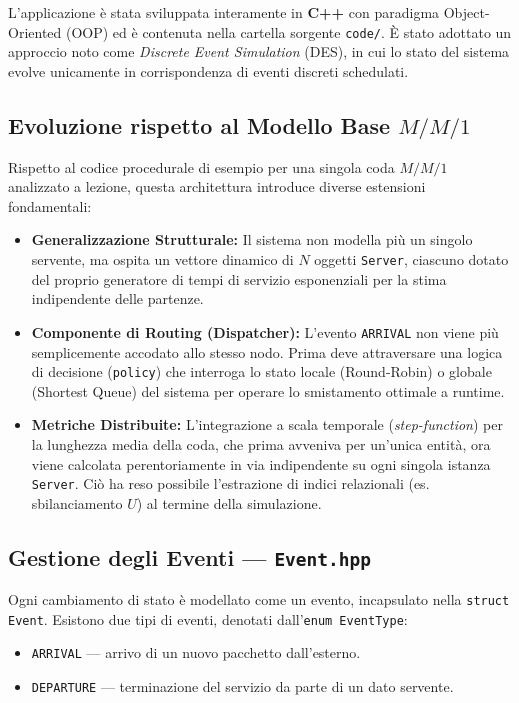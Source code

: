 \documentclass[12pt,a4paper]{article}
\begin{document}
L'applicazione è stata sviluppata interamente in \textbf{C++} con paradigma Object-Oriented (OOP) ed è contenuta nella cartella sorgente \texttt{code/}. È stato adottato un approccio noto come \textit{Discrete Event Simulation} (DES), in cui lo stato del sistema evolve unicamente in corrispondenza di eventi discreti schedulati.

\subsection{Evoluzione rispetto al Modello Base \texorpdfstring{$M/M/1$}{M/M/1}}

Rispetto al codice procedurale di esempio per una singola coda $M/M/1$ analizzato a lezione, questa architettura introduce diverse estensioni fondamentali:
\begin{itemize}
  \item \textbf{Generalizzazione Strutturale:} Il sistema non modella più un singolo servente, ma ospita un vettore dinamico di $N$ oggetti \texttt{Server}, ciascuno dotato del proprio generatore di tempi di servizio esponenziali per la stima indipendente delle partenze.
  \item \textbf{Componente di Routing (Dispatcher):} L'evento \texttt{ARRIVAL} non viene più semplicemente accodato allo stesso nodo. Prima deve attraversare una logica di decisione (\texttt{policy}) che interroga lo stato locale (Round-Robin) o globale (Shortest Queue) del sistema per operare lo smistamento ottimale a runtime.
  \item \textbf{Metriche Distribuite:} L'integrazione a scala temporale (\textit{step-function}) per la lunghezza media della coda, che prima avveniva per un'unica entità, ora viene calcolata perentoriamente in via indipendente su ogni singola istanza \texttt{Server}. Ciò ha reso possibile l'estrazione di indici relazionali (es. sbilanciamento $U$) al termine della simulazione.
\end{itemize}

\subsection{Gestione degli Eventi — \texttt{Event.hpp}}

Ogni cambiamento di stato è modellato come un evento, incapsulato nella \texttt{struct Event}. Esistono due tipi di eventi, denotati dall'\texttt{enum EventType}:

\begin{itemize}
  \item \texttt{ARRIVAL} — arrivo di un nuovo pacchetto dall'esterno.
  \item \texttt{DEPARTURE} — terminazione del servizio da parte di un dato servente.
\end{itemize}
\end{document}
